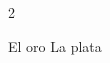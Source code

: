 \documentclass[12pt,addpoints]{repaso}
\begin{document}
\begin{questions}
{\begin{multicols}{2}
\begin{parts}
                    \begin{oneparchoices}
                         \CorrectChoice El oro \choice La plata
                    \end{oneparchoices}

               \end{parts}
          \end{multicols}

     }


\end{questions}
\end{document}
